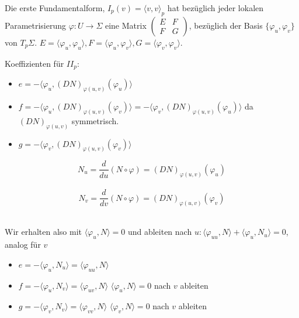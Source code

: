 \documentclass[../main.tex]{subfiles}
\begin{document}
\begin{recall}
    Die erste Fundamentalform, $I_{p}(v) = \langle v,v\rangle_{p}$ hat bezüglich jeder lokalen Parametrisierung $\varphi:U\rightarrow\Sigma$ eine Matrix
    $\left(\begin{smallmatrix} E & F \\ F & G \end{smallmatrix} \right)$, bezüglich der Basis $\{\varphi_{u}, \varphi_{v}\}$ von $T_{p}\Sigma$. 
    $E = \langle \varphi_{u}, \varphi_{u}\rangle, F = \langle \varphi_{u}, \varphi_{v}\rangle, G = \langle \varphi_{v}, \varphi_{v}\rangle$.
\end{recall}
\noindent Koeffizienten für $II_{p}$:
\begin{itemize}
    \item $e = -\langle \varphi_{u}, (DN)_{\varphi(u,v)}(\varphi_{u})\rangle$
    \item $f = -\langle \varphi_{u}, (DN)_{\varphi(u,v)}(\varphi_{v})\rangle = -\langle \varphi_{v}, (DN)_{\varphi(u,v)}(\varphi_{u})\rangle$ da $(DN)_{\varphi(u,v)}$ symmetrisch.
    \item $g = -\langle \varphi_{v}, (DN)_{\varphi(u,v)}(\varphi_{v})\rangle$
\end{itemize}
\begin{notation}
    $$N_{u} = \frac{d}{du}(N\circ\varphi) = (DN)_{\varphi(u,v)}(\varphi_{u})$$\\
    $$N_{v} = \frac{d}{dv}(N\circ\varphi) = (DN)_{\varphi(u,v)}(\varphi_{v})$$\\
\end{notation}
Wir erhalten also mit $\langle \varphi_{u}, N\rangle = 0$ und ableiten nach $u: \langle \varphi_{uu}, N\rangle + \langle \varphi_{u}, N_{u}\rangle = 0$, analog für $v$ 
\begin{itemize}
    \item $e = -\langle \varphi_{u}, N_{u} \rangle = \langle \varphi_{uu}, N \rangle$
    \item $f = -\langle \varphi_{u}, N_{v} \rangle = \langle \varphi_{uv}, N \rangle$ \qquad $\langle \varphi_u,N \rangle = 0$ nach $v$ ableiten
    \item $g = -\langle \varphi_{v}, N_{v} \rangle = \langle \varphi_{vv}, N \rangle$ \qquad $\langle \varphi_v,N \rangle = 0$ nach $v$ ableiten
\end{itemize}
\end{document}
